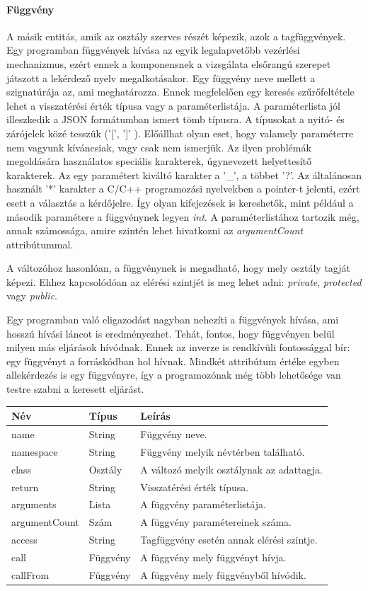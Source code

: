 \documentclass[a4paper,12pt]{report}
\begin{document}
\paragraph{Függvény}
A másik entitás, amik az osztály szerves részét képezik, azok a tagfüggvények. Egy programban függvények hívása az egyik legalapvetőbb vezérlési mechanizmus, ezért ennek a komponensnek a vizsgálata elsőrangú szerepet játszott a lekérdező nyelv megalkotásakor. Egy függvény neve mellett a szignatúrája az, ami meghatározza. Ennek megfelelően egy keresés szűrőfeltétele lehet a visszatérési érték típusa vagy a paraméterlistája. A paraméterlista jól illeszkedik a JSON formátumban ismert tömb típusra. A típusokat a nyitó- és zárójelek közé tesszük ('[', ']' ). Előállhat olyan eset, hogy valamely paraméterre nem vagyunk kíváncsiak, vagy csak nem ismerjük. Az ilyen problémák megoldására használatos speciális karakterek, úgynevezett helyettesítő karakterek. Az egy paramétert kiváltó karakter a '\_', a többet '?'. Az általánosan használt '*' karakter a C/C++ programozási nyelvekben a pointer-t jelenti, ezért esett a választás a kérdőjelre. Így olyan kifejezések is kereshetők, mint például a második paramétere a függvénynek legyen \textit{int}. A paraméterlistához tartozik még, annak számossága, amire szintén lehet hivatkozni az \textit{argumentCount} attribútummal.
\par A változóhoz hasonlóan, a függvénynek is megadható, hogy mely osztály tagját képezi. Ehhez kapcsolódóan az elérési szintjét is meg lehet adni: \textit{private}, \textit{protected} vagy \textit{public}.
\par Egy programban való eligazodást nagyban nehezíti a függvények hívása, ami hosszú hívási láncot is eredményezhet. Tehát, fontos, hogy függvényen belül milyen más eljárások hívódnak. Ennek az inverze is rendkívüli fontossággal bír: egy függvényt a forráskódban hol hívnak. Mindkét attribútum értéke egyben allekérdezés is egy függvényre, így a programozónak még több lehetősége van testre szabni a keresett eljárást.
\begin{center}
	\begin{tabular}{| l | l | l |}
		\hline
		Név & Típus & Leírás \\ \hline
		name & String & Függvény neve. \\ \hline
		namespace & String & Függvény melyik névtérben található. \\ \hline
		class & Osztály & A változó melyik osztálynak az adattagja. \\ \hline
		return & String & Visszatérési érték típusa. \\ \hline
		arguments & Lista & A függvény paraméterlistája. \\ \hline
		argumentCount & Szám & A függvény paramétereinek száma. \\ \hline
		access & String & Tagfüggvény esetén annak elérési szintje. \\ \hline
		call & Függvény & A függvény mely függvényt hívja. \\ \hline
		callFrom & Függvény & A függvény mely függvényből hívódik. \\ \hline
	\end{tabular}
\end{center}
\end{document}
